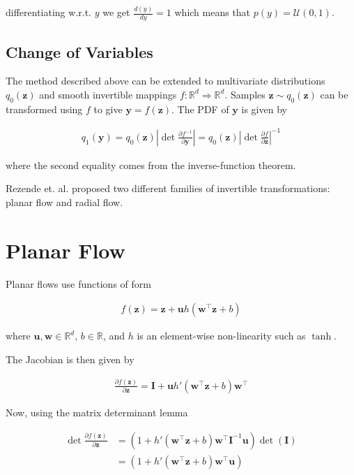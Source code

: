 \documentclass[]{article}
\begin{document}
differentiating w.r.t. $y$ we get $\frac{d(y)}{dy} = 1$ which means that $p(y) = \mathcal{U}(0,1)$.

\subsection{Change of Variables}

The method described above can be extended to multivariate distributions $q_0(\mathbf{z})$ and smooth invertible mappings $f: \mathbb{R}^d\Rightarrow\mathbb{R}^d$. Samples $\mathbf{z} \sim q_0(\mathbf{z})$ can be transformed using $f$ to give $\mathbf{y}=f(\mathbf{z})$. The PDF of $\mathbf{y}$ is given by 

\begin{align}
q_1(\mathbf{y}) = q_0(\mathbf{z})\left|\det \frac{\partial f^{-1}}{\partial \mathbf{y}}\right| = q_0(\mathbf{z})\left|\det \frac{\partial f}{\partial \mathbf{z}}\right|^{-1}
\label{eq:cov}
\end{align}

where the second equality comes from the inverse-function theorem.

Rezende et. al. proposed two different families of invertible transformations: planar flow and radial flow.

\section{Planar Flow}

Planar flows use functions of form


\begin{align}
f(\mathbf{z}) = \mathbf{z} + \mathbf{u}h(\mathbf{w}^\top\mathbf{z} + b)
\label{eq:planarfn}
\end{align}


where $\mathbf{u},\mathbf{w}\in \mathbb{R}^d$, $b \in \mathbb{R}$, and $h$ is an element-wise non-linearity such as $\tanh$.

The Jacobian is then given by

\begin{align*}
\frac{\partial f(\mathbf{z})}{\partial \mathbf{z}} = \mathbf{I} + \mathbf{u}h'(\mathbf{w}^\top\mathbf{z} + b)\mathbf{w}^\top
\end{align*}

Now, using the matrix determinant lemma

\begin{align}
\det\frac{\partial f(\mathbf{z})}{\partial \mathbf{z}} &= (1 + h'(\mathbf{w}^\top\mathbf{z} + b)\mathbf{w}^\top\mathbf{I}^{-1}\mathbf{u})\det(\mathbf{I})\\
&=(1 + h'(\mathbf{w}^\top\mathbf{z} + b)\mathbf{w}^\top\mathbf{u})\label{eq:planar-det}
\end{align}
\end{document}
